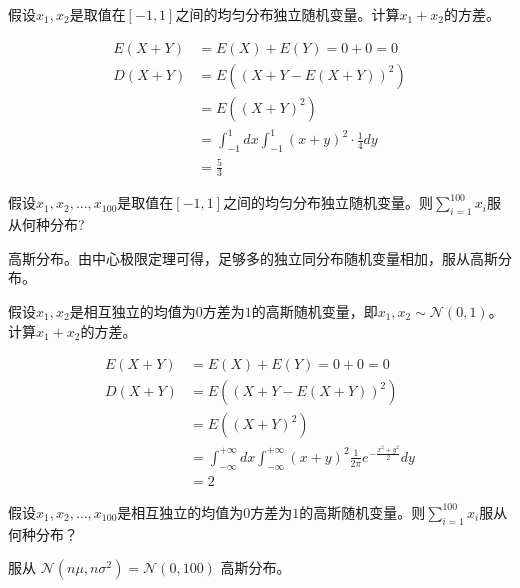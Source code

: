 \begin{problem}
	假设$x_1,x_2$是取值在$[-1,1]$之间的均匀分布独立随机变量。计算$x_1+x_2$的方差。
\end{problem}
\begin{solution}
	\begin{align*}
		E(X + Y) &= E(X) + E(Y) = 0 + 0 = 0\\
		D(X + Y) &= E((X + Y - E(X + Y))^2)\\
		&=E((X + Y)^2)\\
		&=\int_{-1}^{1}dx \int_{-1}^{1}(x + y)^2 \cdot \frac{1}{4} dy\\
		&=\frac{5}{3}
	\end{align*} 
\end{solution}



\begin{problem}
	假设$x_1,x_2,\ldots,x_{100}$是取值在$[-1,1]$之间的均匀分布独立随机变量。则$\sum_{i=1}^{100}x_i$服从何种分布?
\end{problem}
\begin{solution}
	高斯分布。由中心极限定理可得，足够多的独立同分布随机变量相加，服从高斯分布。
\end{solution}



\begin{problem}
	假设$x_1,x_2$是相互独立的均值为$0$方差为$1$的高斯随机变量，即$x_1,x_2\sim \mathcal{N}(0,1)$。计算$x_1+x_2$的方差。
\end{problem}
\begin{solution}
	\begin{align*}
		E(X + Y) &= E(X) + E(Y) = 0 + 0 = 0\\
		D(X + Y) &= E((X + Y - E(X + Y))^2)\\
		&=E((X + Y)^2)\\
		&=\int_{-\infty}^{+\infty}dx \int_{-\infty}^{+\infty} (x + y)^2\frac{1}{2\pi}e^{-\frac{x^2 + y^2}{2}}dy\\
		&=2
	\end{align*}
\end{solution}



\begin{problem}
	假设$x_1,x_2,\ldots,x_{100}$是相互独立的均值为$0$方差为$1$的高斯随机变量。则$\sum_{i=1}^{100}x_i$服从何种分布？
\end{problem}
\begin{solution}
	服从 $\mathcal{N}(n\mu, n\sigma^2) = \mathcal{N}(0, 100)$ 高斯分布。
\end{solution}


